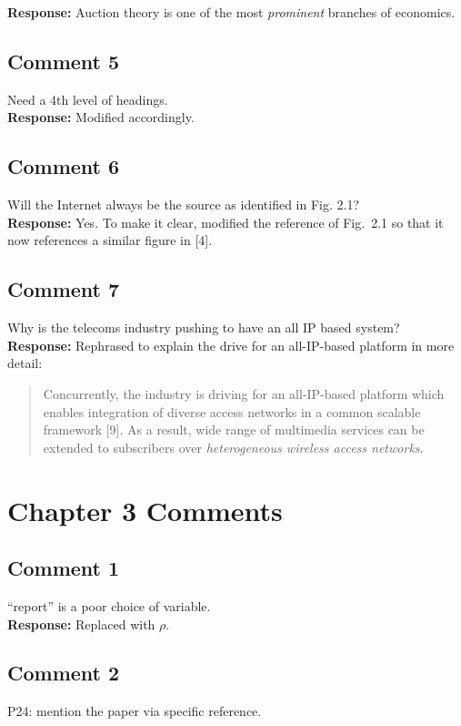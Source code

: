 \documentclass[10pt,a4paper,notitlepage]{article}
\numberwithin{equation}{section}
\begin{document}
\textbf{Response:}
Auction theory is one of the most \emph{prominent} branches of economics.

\subsection{Comment 5}
Need a 4th level of headings.\\[-2ex]

\textbf{Response:}
Modified accordingly.

\subsection{Comment 6}
Will the Internet always be the source as identified in Fig. 2.1?\\[-2ex]

\textbf{Response:}
Yes. To make it clear, modified the reference of Fig.~2.1 so that it now references a similar figure in [4].

\subsection{Comment 7}
Why is the telecoms industry pushing to have an all IP based system?\\[-2ex]

\textbf{Response:}
Rephrased to explain the drive for an all-IP-based platform in more detail:
\begin{quote}
Concurrently, the industry is driving for an all-IP-based platform which enables integration of diverse access networks in a common scalable framework [9]. As a result, wide range of multimedia services can be extended to subscribers over \emph{heterogeneous wireless access networks}.
\end{quote}

\clearpage

\section{Chapter 3 Comments}
\subsection{Comment 1}
``report'' is a poor choice of variable.\\[-2ex]

\textbf{Response:}
Replaced with $\rho$.

\subsection{Comment 2}
P24: mention the paper via specific reference.\\[-2ex]
\end{document}
